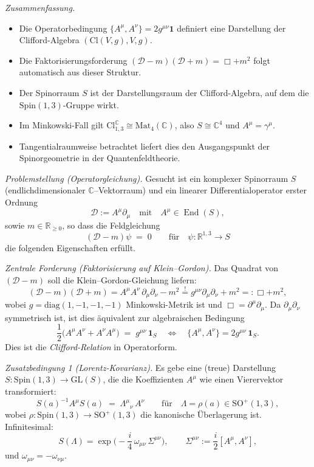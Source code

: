 \documentclass[10pt, letterpaper]{article}
\newcommand{\R}{\mathbb{R}}
\newcommand{\C}{\mathbb{C}}
\newcommand{\Cl}{\mathrm{Cl}}
\newcommand{\GL}{\mathrm{GL}}
\newcommand{\Mat}{\mathrm{Mat}}
\newcommand{\SO}{\mathrm{SO}}
\newcommand{\Spin}{\mathrm{Spin}}
\begin{document}
\emph{Zusammenfassung.}
\begin{itemize}
\item Die Operatorbedingung $\{A^\mu,A^\nu\}=2g^{\mu\nu}\mathbf 1$ definiert eine Darstellung der Clifford-Algebra $(\Cl(V,g),V,g)$.
\item Die Faktorisierungsforderung $(\mathcal D - m)(\mathcal D + m)=\Box+m^2$ folgt automatisch aus dieser Struktur.
\item Der Spinorraum $S$ ist der Darstellungsraum der Clifford-Algebra, auf dem die $\Spin(1,3)$-Gruppe wirkt.
\item Im Minkowski-Fall gilt $\Cl_{1,3}^{\C}\cong\Mat_4(\C)$, also $S\cong\C^4$ und $A^\mu=\gamma^\mu$.
\item Tangentialraumweise betrachtet liefert dies den Ausgangspunkt der Spinorgeometrie in der Quantenfeldtheorie.
\end{itemize}


\pagebreak


\emph{Problemstellung (Operatorgleichung).}
Gesucht ist ein komplexer Spinorraum $S$ (endlichdimensionaler $\C$–Vektorraum) und ein linearer Differentialoperator erster Ordnung
\[
\mathcal D := A^\mu \partial_\mu \quad\text{mit}\quad A^\mu\in \operatorname{End}(S),
\]
sowie $m\in\R_{\ge 0}$, so dass die Feldgleichung
\[
(\mathcal D - m)\psi \;=\; 0 \qquad\text{für}\quad \psi:\R^{1,3}\to S
\]
die folgenden Eigenschaften erfüllt.

\emph{Zentrale Forderung (Faktorisierung auf Klein–Gordon).}
Das Quadrat von $(\mathcal D - m)$ soll die Klein–Gordon-Gleichung liefern:
\[
(\mathcal D - m)(\mathcal D + m)
= A^\mu A^\nu \,\partial_\mu\partial_\nu - m^2
\stackrel{!}{=} g^{\mu\nu}\partial_\mu\partial_\nu + m^2
=: \Box + m^2,
\]
wobei $g=\mathrm{diag}(1,-1,-1,-1)$ Minkowski-Metrik ist und $\Box=\partial^\mu\partial_\mu$.
Da $\partial_\mu\partial_\nu$ symmetrisch ist, ist dies äquivalent zur algebraischen Bedingung
\[
\frac12\big(A^\mu A^\nu + A^\nu A^\mu\big) \;=\; g^{\mu\nu}\,\mathbf 1_S
\quad\Longleftrightarrow\quad
\{A^\mu,A^\nu\} = 2 g^{\mu\nu}\,\mathbf 1_S.
\]
Dies ist die \emph{Clifford-Relation} in Operatorform.

\emph{Zusatzbedingung 1 (Lorentz-Kovarianz).}
Es gebe eine (treue) Darstellung $S:\Spin(1,3)\to \GL(S)$, die die Koeffizienten $A^\mu$ wie einen Vierervektor transformiert:
\[
S(a)^{-1} A^\mu S(a) \;=\; \Lambda^\mu{}_\nu\, A^\nu
\qquad\text{für}\quad \Lambda=\rho(a)\in \SO^+(1,3),
\]
wobei $\rho:\Spin(1,3)\to\SO^+(1,3)$ die kanonische Überlagerung ist. Infinitesimal:
\[
S(\Lambda)=\exp\!\Big(-\frac{i}{4}\,\omega_{\mu\nu}\,\Sigma^{\mu\nu}\Big),
\qquad
\Sigma^{\mu\nu}:=\frac{i}{2}[A^\mu,A^\nu],
\]
und $\omega_{\mu\nu}=-\omega_{\nu\mu}$.
\end{document}
